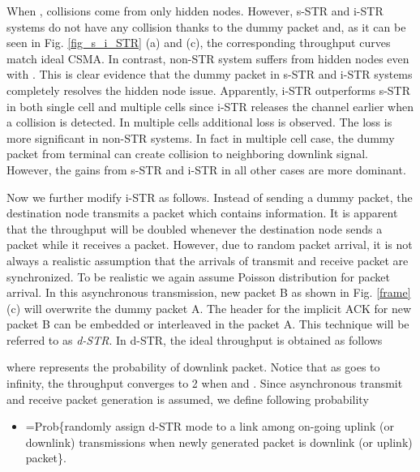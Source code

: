 \documentclass[twocolumn]{IEEEtran}
\begin{document}
When , collisions come from only hidden nodes. However, s-STR
and i-STR systems do not have any collision thanks to the dummy
packet and, as it can be seen in Fig. \ref{fig_s_i_STR} (a) and (c),
the corresponding throughput curves match ideal CSMA. In contrast,
non-STR system suffers from hidden nodes even with . This is
clear evidence that the dummy packet in s-STR and i-STR systems
completely resolves the hidden node issue. Apparently, i-STR
outperforms s-STR in both single cell and multiple cells since i-STR
releases the channel earlier when a collision is detected. In
multiple cells additional loss is observed. The loss is more
significant in non-STR systems. In fact in multiple cell case, the
dummy packet from terminal can create collision to neighboring
downlink signal. However, the gains from s-STR and i-STR in all
other cases are more dominant.

Now we further modify i-STR as follows. Instead of sending a dummy
packet, the destination node transmits a packet which contains
information. It is apparent that the throughput will be doubled
whenever the destination node sends a packet while it receives a
packet. However, due to random packet arrival, it is not always a
realistic assumption that the arrivals of transmit and receive
packet are synchronized. To be realistic we again assume Poisson
distribution for packet arrival. In this asynchronous transmission,
new packet B as shown in Fig. \ref{frame} (c) will overwrite the
dummy packet A. The header for the implicit ACK for new packet
B can be embedded or interleaved in the packet A. This technique
will be referred to as \textit{d-STR}. In d-STR, the ideal
throughput is obtained as follows


where  represents the probability of downlink packet. Notice that
as  goes to infinity, the throughput  converges to 2 when
 and . Since asynchronous transmit and receive
packet generation is assumed, we define following probability

\begin{itemize}
\item =Prob\{randomly assign d-STR mode to a link among on-going uplink (or
downlink) transmissions when newly generated packet is downlink (or
uplink) packet\}.
\end{itemize}
\end{document}
